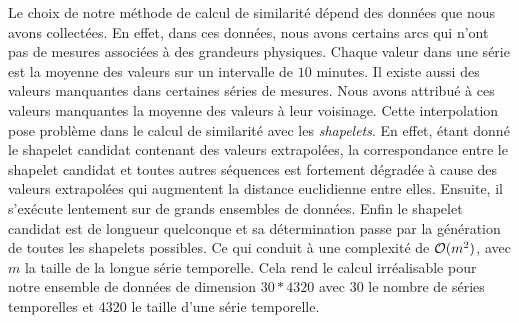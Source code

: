 Le choix de notre m\'ethode de calcul de similarit\'e d\'epend des donn\'ees que nous avons collect\'ees. En effet, dans ces donn\'ees, nous avons certains arcs qui n'ont pas de mesures associ\'ees \`a des grandeurs physiques. Chaque valeur dans une s\'erie est la moyenne des valeurs sur un intervalle de $10$ minutes. 
Il existe aussi des valeurs manquantes dans certaines s\'eries de mesures. Nous avons attribu\'e \`a ces valeurs manquantes la moyenne des valeurs \`a leur voisinage. Cette interpolation pose probl\`eme dans le calcul de similarit\'e avec les {\em shapelets}.
 En effet, \'etant donn\'e le shapelet candidat contenant des valeurs extrapol\'ees, la correspondance entre le shapelet candidat et toutes autres s\'equences est fortement d\'egrad\'ee \`a cause des valeurs extrapol\'ees qui augmentent la distance euclidienne entre elles. Ensuite, il s'ex\'ecute lentement sur de grands ensembles de donn\'ees. Enfin le shapelet candidat est de longueur quelconque et sa d\'etermination passe par la g\'en\'eration de toutes les shapelets possibles. 
 Ce qui conduit \`a une complexit\'e de ${\cal O}(m^2)$, avec $m$ la taille de la longue s\'erie temporelle. 
 Cela rend le calcul irr\'ealisable pour notre ensemble de donn\'ees de dimension $30 * 4320$ avec $30$ le nombre de s\'eries temporelles et $4320$ le taille d'une s\'erie temporelle.
\newline

